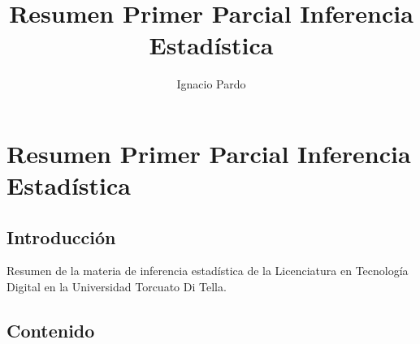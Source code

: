 \documentclass[
]{article}
\title{Resumen Primer Parcial Inferencia Estadística}
\author{Ignacio Pardo}
\date{}
\begin{document}
\maketitle

\hypertarget{resumen-primer-parcial-inferencia-estaduxedstica}{%
\section{Resumen Primer Parcial Inferencia
Estadística}\label{resumen-primer-parcial-inferencia-estaduxedstica}}

\hypertarget{introducciuxf3n}{%
\subsection{Introducción}\label{introducciuxf3n}}

Resumen de la materia de inferencia estadística de la Licenciatura en
Tecnología Digital en la Universidad Torcuato Di Tella.

\hypertarget{contenido}{%
\subsection{Contenido}\label{contenido}}
\end{document}
